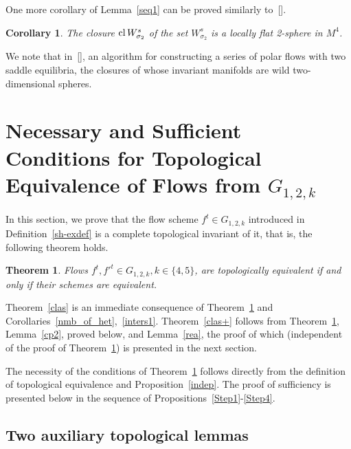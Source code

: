 \documentclass[%
 aip,
 amsmath,amssymb,
preprint,%
]{revtex4-1}
\newtheorem{theorem}{Theorem}
\newtheorem{cor}{Corollary}
\begin{document}
One more corollary of Lemma~\ref{seq1}  can be proved similarly to~[]. 

\begin{cor}\label{flat} The closure ${\rm cl}\, W^s_{\sigma_2}$ of the set $W^s_{\sigma_2}$ is a locally flat 2-sphere in $M^4$.
\end{cor}

We note that in~[], an algorithm for constructing a series of polar flows with two saddle equilibria, the closures of whose invariant manifolds are wild two-dimensional spheres. 



\section{Necessary and Sufficient Conditions for Topological Equivalence of Flows from $G_{1,2,k}$}

In this section, we prove that the flow scheme $f^t\in G_{1,2,k}$ introduced in Definition~\ref{sh-exdef} is a complete topological invariant of it, that is, the following theorem holds.

\begin{theorem}\label{cond} Flows $f^t, {f'}^t\in G_{1,2,k}, k\in \{4,5\}$, are topologically equivalent if and only if their schemes are equivalent. %
\end{theorem}

Theorem~\ref{clas} is an immediate consequence of Theorem~\ref{cond} and Corollaries~\ref{nmb_of_het},~\ref{inters1}. Theorem~\ref{clas+} follows from Theorem~\ref{cond}, Lemma~\ref{cp2}, proved below, and Lemma~\ref{rea}, the proof of which (independent of the proof of Theorem~\ref{cond}) is presented in the next section.

The necessity of the conditions of Theorem~\ref{cond} follows directly from the definition of topological equivalence and Proposition~\ref{indep}. The proof of sufficiency is presented below in the sequence of Propositions~\ref{Step1}-\ref{Step4}.

\subsection{Two auxiliary topological lemmas}
\end{document}
